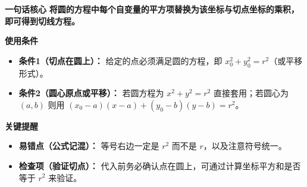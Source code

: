 \begin{summarybox}
	\textbf{\textcolor{CSummary}{一句话核心}}
	\textbf{将圆的方程中每个自变量的平方项替换为该坐标与切点坐标的乘积，即可得到切线方程。}

	\medskip
	\textbf{\textcolor{CSummary}{使用条件}}
	\begin{itemize}[leftmargin=*, itemsep=0.5em, topsep=0.4em]
		\item \textbf{条件1（切点在圆上）：} 给定的点必须满足圆的方程，即 $x_0^2+y_0^2=r^2$（或平移形式）。
		\item \textbf{条件2（圆心原点或平移）：} 若圆方程为 $x^2+y^2=r^2$ 直接套用；若圆心为 $(a,b)$ 则用 $(x_0-a)(x-a)+(y_0-b)(y-b)=r^2$。
	\end{itemize}

	\medskip
	\textbf{\textcolor{CSummary}{关键提醒}}
	\begin{itemize}[leftmargin=*, itemsep=0.5em, topsep=0.4em]
		\item \textbf{易错点（公式记混）：} 等号右边一定是 $r^2$ 而不是 $r$，以及注意符号统一。
		\item \textbf{检查项（验证切点）：} 代入前务必确认点在圆上，可通过计算坐标平方和是否等于 $r^2$ 来验证。
	\end{itemize}

\end{summarybox}
